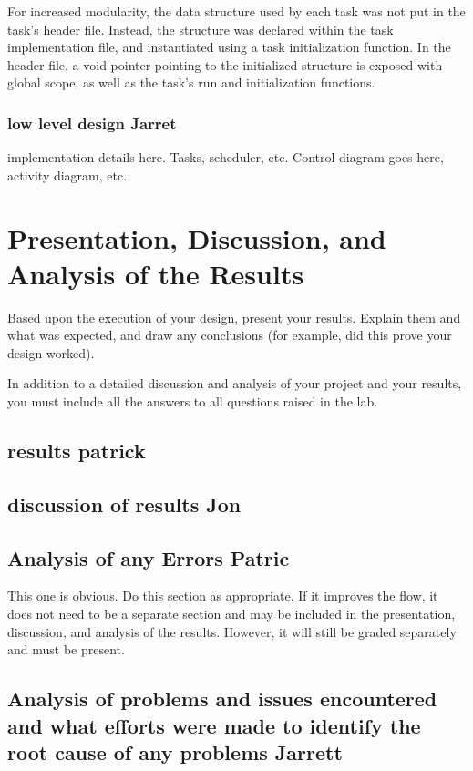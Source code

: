 \documentclass[12pt]{article} %
\begin{document}
For increased modularity, the data structure used by each task was not put in
the task's header file.  Instead, the structure was declared within the task
implementation file, and instantiated using a task initialization function.  In
the header file, a void pointer pointing to the initialized structure is
exposed with global scope, as well as the task's run and initialization functions.

\subsubsection{low level design  Jarret}

implementation details here. Tasks, scheduler, etc. Control diagram goes here, activity diagram, etc.

\section{Presentation, Discussion, and Analysis of the Results}

Based upon the execution of your design, present your results. Explain them and what was expected, and draw any conclusions (for example, did this prove your design worked).

In addition to a detailed discussion and analysis of your project and your results, you must include all the answers to all questions raised in the lab.
\subsection{results  patrick}

\subsection{discussion of results  Jon}

\subsection{Analysis of any Errors  Patric}

This one is obvious. Do this section as appropriate.  If it improves the flow, it does not need to be a separate section and may be included in the presentation, discussion, and analysis of the results.  However, it will still be graded separately and must be present.

\subsection{Analysis of problems and issues encountered and what efforts were made to identify the root cause of any problems  Jarrett}
\end{document}
